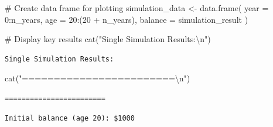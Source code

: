 \documentclass[
  letterpaper,
  DIV=11,
  numbers=noendperiod]{scrartcl}
\newenvironment{Shaded}{\begin{snugshade}}{\end{snugshade}}
\newcommand{\AttributeTok}[1]{\textcolor[rgb]{0.40,0.45,0.13}{#1}}
\newcommand{\CommentTok}[1]{\textcolor[rgb]{0.37,0.37,0.37}{#1}}
\newcommand{\DecValTok}[1]{\textcolor[rgb]{0.68,0.00,0.00}{#1}}
\newcommand{\FunctionTok}[1]{\textcolor[rgb]{0.28,0.35,0.67}{#1}}
\newcommand{\NormalTok}[1]{\textcolor[rgb]{0.00,0.23,0.31}{#1}}
\newcommand{\OtherTok}[1]{\textcolor[rgb]{0.00,0.23,0.31}{#1}}
\newcommand{\SpecialCharTok}[1]{\textcolor[rgb]{0.37,0.37,0.37}{#1}}
\newcommand{\StringTok}[1]{\textcolor[rgb]{0.13,0.47,0.30}{#1}}
\begin{document}
\begin{Shaded}
\begin{Highlighting}[]
\CommentTok{\# Create data frame for plotting}
\NormalTok{simulation\_data }\OtherTok{\textless{}{-}} \FunctionTok{data.frame}\NormalTok{(}
  \AttributeTok{year =} \DecValTok{0}\SpecialCharTok{:}\NormalTok{n\_years,}
  \AttributeTok{age =} \DecValTok{20}\SpecialCharTok{:}\NormalTok{(}\DecValTok{20} \SpecialCharTok{+}\NormalTok{ n\_years),}
  \AttributeTok{balance =}\NormalTok{ simulation\_result}
\NormalTok{)}

\CommentTok{\# Display key results}
\FunctionTok{cat}\NormalTok{(}\StringTok{"Single Simulation Results:}\SpecialCharTok{\textbackslash{}n}\StringTok{"}\NormalTok{)}
\end{Highlighting}
\end{Shaded}

\begin{verbatim}
Single Simulation Results:
\end{verbatim}

\begin{Shaded}
\begin{Highlighting}[]
\FunctionTok{cat}\NormalTok{(}\StringTok{"========================}\SpecialCharTok{\textbackslash{}n}\StringTok{"}\NormalTok{)}
\end{Highlighting}
\end{Shaded}

\begin{verbatim}
========================
\end{verbatim}

\begin{Shaded}
\end{Shaded}

\begin{verbatim}
Initial balance (age 20): $1000
\end{verbatim}

\begin{Shaded}
\end{Shaded}
\end{document}

